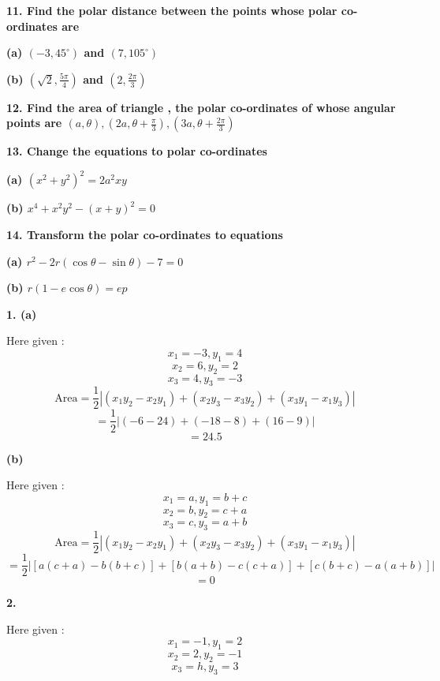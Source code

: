 \documentclass{article}
\begin{document}
\begin{flushleft}
\textbf{11. Find the polar distance between the points whose polar co-ordinates are }\par
\textbf{(a) $(-3, 45^{\circ})$ and $(7, 105^{\circ})$}\par
\textbf{(b) $(\sqrt{2}, \frac{5\pi}{4} )$ and $(2, \frac{2\pi}{3})$}\par
\vspace{0.4cm}
\textbf{12. Find the area of triangle , the polar co-ordinates of whose angular points are $(a , \theta), (2a , \theta+\frac{\pi}{3}), (3a , \theta+\frac{2\pi}{3})$}\par
\vspace{0.4cm}
\textbf{13. Change the equations to polar co-ordinates}\par
\textbf{(a) $(x^2+y^2)^2 = 2a^2xy$}\par
\textbf{(b) $x^4 + x^2y^2 - (x+y)^2 = 0$}\par
\vspace{0.4cm}
\textbf{14. Transform the polar co-ordinates to equations}\par
\textbf{(a) $r^{2}-2r(\cos\theta-\sin\theta)-7 = 0$}\par
\textbf{(b) $r(1- e\cos\theta) = ep$}\par

\newpage
\textbf{1. \hspace{0.4cm}(a)}\par
\vspace{0.5cm}
 Here given : 
\[ x_1 = -3, y_1 = 4 \]
\[ x_2 = 6, y_2 = 2 \]
\[ x_3 = 4, y_3 = -3 \]
\[\text{Area} = \frac{1}{2} |(x_1y_2-x_2y_1)+(x_2y_3-x_3y_2)+(x_3y_1-x_1y_3)| \]
\[=\frac{1}{2} |(-6-24)+(-18-8)+(16-9)|\]
\[=24.5\]\par
\vspace{1cm}
\textbf{\hspace{1cm}(b)}\par
\vspace{0.5cm}
 Here given :
\[ x_1 = a, y_1 = b+c \]
\[ x_2 = b, y_2 = c+a \]
\[ x_3 = c, y_3 = a+b \]
\[\text{Area} = \frac{1}{2} |(x_1y_2-x_2y_1)+(x_2y_3-x_3y_2)+(x_3y_1-x_1y_3)| \]
\[=\frac{1}{2} |[a(c+a)-b(b+c)]+[b(a+b)-c(c+a)]+[c(b+c)-a(a+b)]|\]
\[=0\]\par
\vspace{1cm}

\textbf{2.}\par
\vspace{0.5cm}
Here given :
\[ x_1 = -1, y_1 = 2 \]
\[ x_2 = 2, y_2 = -1 \]
\[ x_3 = h, y_3 = 3 \]\par


\end{flushleft}
\end{document}
